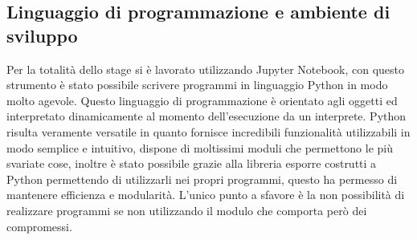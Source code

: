 \subsection{Linguaggio di programmazione e ambiente di sviluppo}
Per la totalità dello stage si è lavorato utilizzando Jupyter Notebook, con questo strumento è stato possibile scrivere programmi in linguaggio Python in modo molto agevole. Questo linguaggio di programmazione è orientato agli oggetti ed interpretato dinamicamente al momento dell’esecuzione da un interprete. Python risulta veramente versatile in quanto fornisce incredibili funzionalità utilizzabili in modo semplice e intuitivo, dispone di moltissimi moduli che permettono le più svariate cose, inoltre è stato possibile grazie alla libreria  esporre costrutti  a Python permettendo di utilizzarli nei propri programmi, questo ha permesso di mantenere efficienza e modularità. L'unico punto a sfavore è la non possibilità di realizzare programmi  se non utilizzando il modulo  che comporta però dei compromessi.
	
